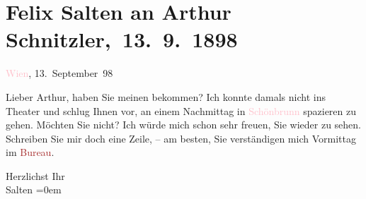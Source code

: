

\renewcommand{\erwaehnteInstitutionen}{Institutionen: Wiener Allgemeine Zeitung}
\renewcommand{\erwaehnteOrte}{Orte: Schlosspark Schönbrunn, Wien}
\renewcommand{\erwaehnteWerke}{}
\section[ Felix Salten an Arthur Schnitzler, 13. 9. 1898]{Felix Salten an Arthur Schnitzler, 13. 9. 1898}
\nopagebreak{}
\rehead{ }\normalsize\beginnumbering{}
\toendnotes[C]{\smallbreak\pagebreak[2]}
\toendnotes[C]{\smallbreak}
\pstart
           \raggedleft{}{\pb}\textcolor{pink}{Wien}{}\ledrightnote{\textcolor{pink}{Wien}}, 13. September 98\pend
           
\pstart
           Lieber Arthur, haben Sie meinen \label{K_L03283-1v}\label{K_L03283-1h} bekommen? Ich konnte damals nicht ins Theater und schlug Ihnen vor, an einem
               Nachmittag in \textcolor{pink}{Schönbrunn}{}\ledrightnote{\textcolor{pink}{Schlosspark Schönbrunn}} spazieren zu gehen.
               Möchten Sie nicht? Ich würde mich schon sehr freuen, Sie wieder zu sehen. Schreiben
               Sie mir doch eine Zeile, – am besten, Sie verständigen mich Vormittag im
                  \textcolor{brown}{Bureau}{}\ledrightnote{{$\rightarrow$}\textcolor{brown}{Wiener Allgemeine Zeitung}}.\pend
           
\pstart
           Herzlichst Ihr {\\[\baselineskip]}\spacefill\mbox{Salten}\pend
           \leftskip=0em{}\endnumbering{}  
      